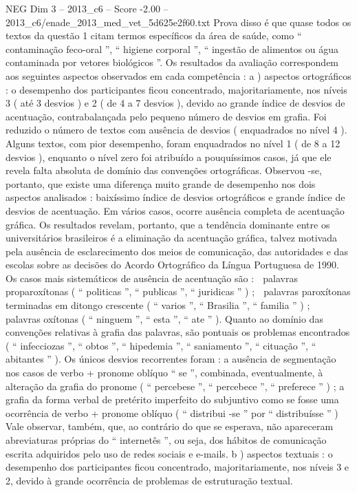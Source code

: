\begin{textsample}{NEG Dim 3 – 2013\_c6 – Score -2.00 – 2013\_c6/enade\_2013\_med\_vet\_5d625e2f60.txt}
Prova disso é que quase todos os textos da questão 1 citam termos específicos da área de saúde, como “ contaminação feco-oral ”, “ higiene corporal ”, “ ingestão de alimentos ou água contaminada por vetores biológicos ”.
Os resultados da avaliação correspondem aos seguintes aspectos observados em cada competência : a ) aspectos ortográficos : o desempenho dos participantes ficou concentrado, majoritariamente, nos níveis 3 ( até 3 desvios ) e 2 ( de 4 a 7 desvios ), devido ao grande índice de desvios de acentuação, contrabalançada pelo pequeno número de desvios em grafia.
Foi reduzido o número de textos com ausência de desvios ( enquadrados no nível 4 ).
Alguns textos, com pior desempenho, foram enquadrados no nível 1 ( de 8 a 12 desvios ), enquanto o nível zero foi atribuído a pouquíssimos casos, já que ele revela falta absoluta de domínio das convenções ortográficas.
Observou -se, portanto, que existe uma diferença muito grande de desempenho nos dois aspectos analisados : baixíssimo índice de desvios ortográficos e grande índice de desvios de acentuação.
Em vários casos, ocorre ausência completa de acentuação gráfica.
Os resultados revelam, portanto, que a tendência dominante entre os universitários brasileiros é a eliminação da acentuação gráfica, talvez motivada pela ausência de esclarecimento dos meios de comunicação, das autoridades e das escolas sobre as decisões do Acordo Ortográfico da Língua Portuguesa de 1990.
Os casos mais sistemáticos de ausência de acentuação são :  palavras proparoxítonas ( “ politicas ”, “ publicas ”, “ juridicas ” ) ;  palavras paroxítonas terminadas em ditongo crescente ( “ varios ”, “ Brasilia ”, “ familia ” ) ;  palavras oxítonas ( “ ninguem ”, “ esta ”, “ ate ” ).
Quanto ao domínio das convenções relativas à grafia das palavras, são pontuais os problemas encontrados ( “ infecciozas ”, “ obtos ”, “ hipedemia ”, “ saniamento ”, “ cituação ”, “ abitantes ” ).
Os únicos desvios recorrentes foram : a ausência de segmentação nos casos de verbo + pronome oblíquo “ se ”, combinada, eventualmente, à alteração da grafia do pronome ( “ percebese ”, “ percebece ”, “ preferece ” ) ; a grafia da forma verbal de pretérito imperfeito do subjuntivo como se fosse uma ocorrência de verbo + pronome oblíquo ( “ distribui -se ” por “ distribuísse ” ) Vale observar, também, que, ao contrário do que se esperava, não apareceram abreviaturas próprias do “ internetês ”, ou seja, dos hábitos de comunicação escrita adquiridos pelo uso de redes sociais e e-mails. b ) aspectos textuais : o desempenho dos participantes ficou concentrado, majoritariamente, nos níveis 3 e 2, devido à grande ocorrência de problemas de estruturação textual.

\end{textsample}
